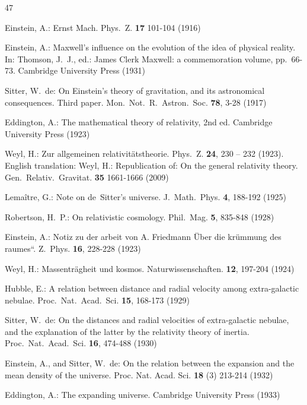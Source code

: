 \documentclass[11pt]{article}
\begin{document}
\begin{thebibliography}{47}

 Einstein, A.: Ernst Mach. Phys.\ Z. \textbf{17} 101-104 (1916)

 Einstein, A.: Maxwell's influence on the evolution of the idea of physical reality. In: Thomson, J.~J., ed.: James Clerk Maxwell: a commemoration volume, pp.~66-73. Cambridge University Press (1931)

 Sitter, W.~de: On Einstein's theory of gravitation, and its astronomical consequences. Third paper.  Mon.\ Not.\ R.\ Astron.\ Soc. \textbf{78}, 3-28 (1917)

 Eddington, A.: The mathematical theory of relativity, 2nd ed. Cambridge University Press (1923)

 Weyl, H.: Zur allgemeinen relativit\"{a}tstheorie. Phys.\ Z. \textbf{24}, 230 -- 232 (1923). English translation: Weyl, H.: Republication of: On the general relativity theory. Gen.\ Relativ.\ Gravitat. \textbf{35} 1661-1666 (2009)

 Lema\^{i}tre, G.: Note on de~Sitter's universe. J.\ Math.\ Phys. \textbf{4}, 188-192 (1925)

 Robertson, H.~P.: On relativistic cosmology. Phil.\ Mag. \textbf{5}, 835-848 (1928)

 Einstein, A.: Notiz zu der arbeit von {A. Friedmann} {\glqq}{{\"U}ber} die kr{\"u}mmung des raumes``. Z.\ Phys. \textbf{16}, 228-228 (1923)

 Weyl, H.: Massentr{\"a}gheit und kosmos. Naturwissenschaften. \textbf{12}, 197-204 (1924)

 Hubble, E.: A relation between distance and radial velocity among extra-galactic nebulae. Proc.\ Nat.\ Acad.\ Sci. \textbf{15}, 168-173 (1929)

 Sitter, W.~de: On the distances and radial velocities of extra-galactic nebulae, and the explanation of the latter by the relativity theory of inertia. Proc.\ Nat.\ Acad.\ Sci. \textbf{16}, 474-488 (1930)

 Einstein, A., and Sitter, W.~de: On the relation between the expansion and the mean density of the universe. Proc. Nat. Acad. Sci. \textbf{18} (3) 213-214 (1932)

 Eddington, A.: The expanding universe. Cambridge University Press (1933)


\end{thebibliography}
\end{document}
